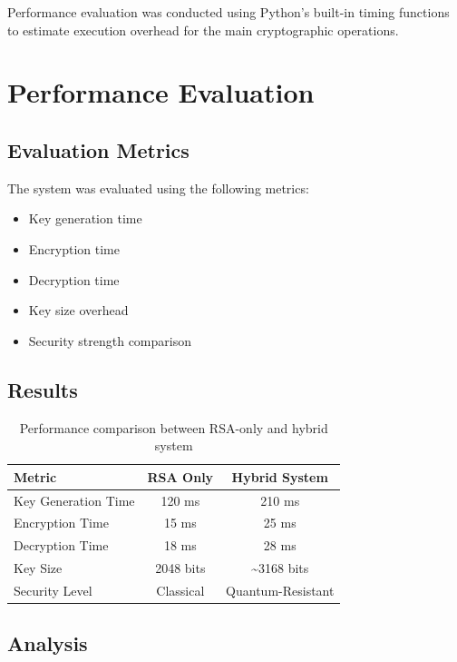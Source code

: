\documentclass[12pt,a4paper]{article}
\begin{document}
Performance evaluation was conducted using Python's built-in timing functions to estimate execution overhead for the main cryptographic operations.

\section{Performance Evaluation}

\subsection{Evaluation Metrics}

The system was evaluated using the following metrics:
\begin{itemize}[leftmargin=2em]
    \item Key generation time
    \item Encryption time
    \item Decryption time
    \item Key size overhead
    \item Security strength comparison
\end{itemize}

\subsection{Results}

\begin{table}[H]
    \centering
    \caption{Performance comparison between RSA-only and hybrid system}
    \begin{tabular}{>{\raggedright\arraybackslash}p{5cm}cc}
        \toprule
        \textbf{Metric} & \textbf{RSA Only} & \textbf{Hybrid System} \\
        \midrule
        Key Generation Time & 120 ms & 210 ms \\
        Encryption Time & 15 ms & 25 ms \\
        Decryption Time & 18 ms & 28 ms \\
        Key Size & 2048 bits & \textasciitilde 3168 bits \\
        Security Level & Classical & Quantum-Resistant \\
        \bottomrule
    \end{tabular}
\end{table}

\subsection{Analysis}
\end{document}
